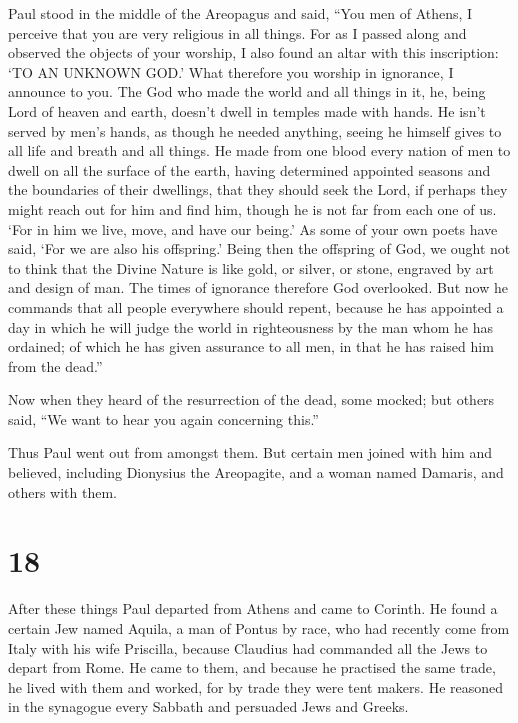 Paul stood in the middle of the Areopagus and said, ``You
men of Athens, I perceive that you are very religious in all things.
 For as I passed along and observed the objects of your
worship, I also found an altar with this inscription: `TO AN UNKNOWN
GOD.' What therefore you worship in ignorance, I announce to you.
 The God who made the world and all things in it, he, being
Lord of heaven and earth, doesn't dwell in temples made with hands.
 He isn't served by men's hands, as though he needed
anything, seeing he himself gives to all life and breath and all things.
 He made from one blood every nation of men to dwell on all
the surface of the earth, having determined appointed seasons and the
boundaries of their dwellings,  that they should seek the
Lord, if perhaps they might reach out for him and find him, though he is
not far from each one of us.  `For in him we live, move,
and have our being.' As some of your own poets have said, `For we are
also his offspring.'  Being then the offspring of God, we
ought not to think that the Divine Nature is like gold, or silver, or
stone, engraved by art and design of man.  The times of
ignorance therefore God overlooked. But now he commands that all people
everywhere should repent,  because he has appointed a day
in which he will judge the world in righteousness by the man whom he has
ordained; of which he has given assurance to all men, in that he has
raised him from the dead.''

 Now when they heard of the resurrection of the dead, some
mocked; but others said, ``We want to hear you again concerning this.''

 Thus Paul went out from amongst them.  But
certain men joined with him and believed, including Dionysius the
Areopagite, and a woman named Damaris, and others with them.

\hypertarget{section-17}{%
\section{18}\label{section-17}}

 After these things Paul departed from Athens and came to
Corinth.  He found a certain Jew named Aquila, a man of
Pontus by race, who had recently come from Italy with his wife
Priscilla, because Claudius had commanded all the Jews to depart from
Rome. He came to them,  and because he practised the same
trade, he lived with them and worked, for by trade they were tent
makers.  He reasoned in the synagogue every Sabbath and
persuaded Jews and Greeks.

